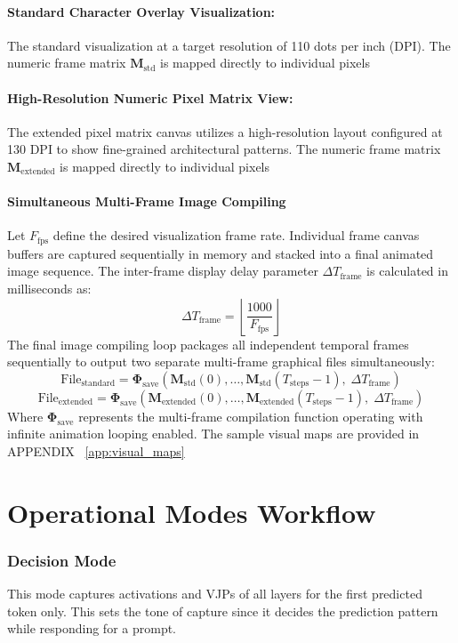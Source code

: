 \documentclass[10pt,conference]{IEEEtran}
\begin{document}
\paragraph{Standard Character Overlay Visualization:}
The standard visualization at a target resolution of 110 dots per inch (DPI).  The numeric frame matrix $\mathbf{M}_{\text{std}}$ is mapped directly to individual pixels

\paragraph{High-Resolution Numeric Pixel Matrix View:}
The extended pixel matrix canvas utilizes a high-resolution layout configured at 130 DPI to show fine-grained architectural patterns. The numeric frame matrix $\mathbf{M}_{\text{extended}}$ is mapped directly to individual pixels

\paragraph{Simultaneous Multi-Frame Image Compiling}
Let $F_{\text{fps}}$ define the desired visualization frame rate. Individual frame canvas buffers are captured sequentially in memory and stacked into a final animated image sequence. The inter-frame display delay parameter $\Delta T_{\text{frame}}$ is calculated in milliseconds as:
\[
\Delta T_{\text{frame}} = \left\lfloor \frac{1000}{F_{\text{fps}}} \right\rfloor
\]
The final image compiling loop packages all independent temporal frames sequentially to output two separate multi-frame graphical files simultaneously:
\[
\text{File}_{\text{standard}} = \mathbf{\Phi}_{\text{save}}\left( \mathbf{M}_{\text{std}}(0), \dots, \mathbf{M}_{\text{std}}(T_{\text{steps}}-1), \; \Delta T_{\text{frame}} \right)
\]
\[
\text{File}_{\text{extended}} = \mathbf{\Phi}_{\text{save}}\left( \mathbf{M}_{\text{extended}}(0), \dots, \mathbf{M}_{\text{extended}}(T_{\text{steps}}-1), \; \Delta T_{\text{frame}} \right)
\]
Where $\mathbf{\Phi}_{\text{save}}$ represents the multi-frame compilation function operating with infinite animation looping enabled.
The sample visual maps are provided in APPENDIX ~\ref{app:visual_maps}
\section{Operational Modes Workflow}

\subsubsection{Decision Mode}
This mode captures activations and VJPs of all layers for the first predicted token only. This sets the tone of capture since it decides the prediction pattern while responding for a prompt.
\end{document}
